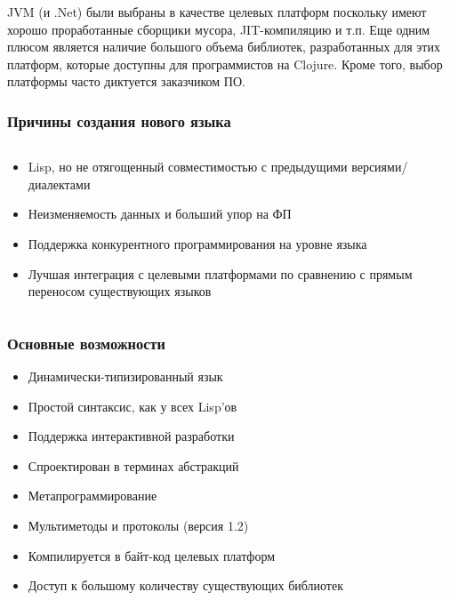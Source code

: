 \documentclass[ignorenonframetext]{beamer}
\begin{document}
JVM (и .Net) были выбраны в качестве целевых платформ поскольку имеют хорошо проработанные
сборщики мусора, JIT-компиляцию и т.п.  Еще одним плюсом является наличие большого объема
библиотек, разработанных для этих платформ, которые доступны для программистов на
Clojure.  Кроме того, выбор платформы часто диктуется заказчиком ПО.

\begin{frame}[t]
  \frametitle{Причины создания нового языка}
  \begin{columns}
    \begin{column}{0.75\textwidth}
  \begin{itemize}
  \item Lisp, но не отягощенный совместимостью с предыдущими версиями/диалектами
  \item Неизменяемость данных и больший упор на ФП
  \item Поддержка конкурентного программирования на уровне языка
  \item Лучшая интеграция с целевыми платформами по сравнению с прямым переносом
    существующих языков
  \end{itemize}
    \end{column}
    \begin{column}{0.25\textwidth}
      \begin{center}
      \end{center}
    \end{column}
  \end{columns}
\end{frame}

\begin{frame}[t]
  \frametitle{Основные возможности}
  \begin{itemize}
  \item Динамически-типизированный язык
  \item Простой синтаксис, как у всех Lisp'ов
  \item Поддержка интерактивной разработки
  \item Спроектирован в терминах абстракций
  \item Метапрограммирование
  \item Мультиметоды и протоколы (версия 1.2)
  \item Компилируется в байт-код целевых платформ
  \item Доступ к большому количеству существующих библиотек
  \end{itemize}
\end{frame}
\end{document}
